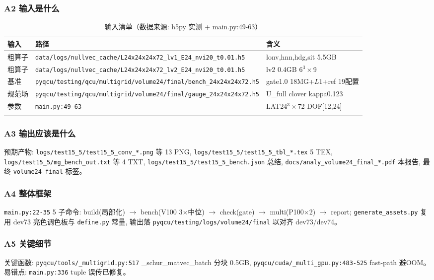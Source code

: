 \documentclass[UTF8]{ctexart}
\begin{document}
\subsubsection{A2 输入是什么}
\begin{xltabular}{\textwidth}{lXl}
\toprule
输入 & 路径 & 含义 \\
\midrule
\endhead
粗算子 & \texttt{\nolinkurl{data/logs/nullvec_cache/L24x24x24x72_lv1_E24_nvi20_t0.01.h5}} & lonv,hnn,hdg,sit 5.5GB \\
粗算子 & \texttt{\nolinkurl{data/logs/nullvec_cache/L24x24x24x72_lv2_E24_nvi20_t0.01.h5}} & lv2 0.4GB 6$^3\times$9 \\
基准 & \texttt{\nolinkurl{pyqcu/testing/qcu/multigrid/volume24/final/bench_24x24x24x72.h5}} & gate1.0 18MG+$L1$+ref 19配置 \\
规范场 & \texttt{\nolinkurl{pyqcu/testing/qcu/multigrid/volume24/final/gauge_24x24x24x72.h5}} & U\_full clover kappa0.123 \\
参数 & \texttt{\nolinkurl{main.py:49-63}} & LAT24$^3\times$72 DOF[12,24] \\
\bottomrule
\caption{输入清单（数据来源: h5py 实测 + main.py:49-63）}
\end{xltabular}

\subsubsection{A3 输出应该是什么}
预期产物: \texttt{\nolinkurl{logs/test15_5/test15_5_conv_*.png}} 等 13 PNG, \texttt{\nolinkurl{logs/test15_5/test15_5_tbl_*.tex}} 5 TEX, \texttt{\nolinkurl{logs/test15_5/mg_bench_out.txt}} 等 4 TXT, \texttt{\nolinkurl{logs/test15_5/test15_5_bench.json}} 总结, \texttt{\nolinkurl{docs/analy_volume24_final_*.pdf}} 本报告, 最终 \texttt{\nolinkurl{volume24_final}} 标签。

\subsubsection{A4 整体框架}
\texttt{\nolinkurl{main.py:22-35}} 5 子命令: build(局部化) $\to$ bench(V100 3$\times$中位) $\to$ check(gate) $\to$ multi(P100$\times$2) $\to$ report; \texttt{\nolinkurl{generate_assets.py}} 复用 dev73 亮色调色板与 \texttt{\nolinkurl{define.py}} 常量, 输出落 \texttt{\nolinkurl{pyqcu/testing/logs/volume24/final}} 以对齐 dev73/dev74。

\subsubsection{A5 关键细节}
关键函数: \texttt{\nolinkurl{pyqcu/tools/_multigrid.py:517}} \_schur\_matvec\_batch 分块 0.5GB, \texttt{\nolinkurl{pyqcu/cuda/_multi_gpu.py:483-525}} fast-path 避OOM。易错点: \texttt{\nolinkurl{main.py:336}} tuple 误传已修复。

\end{document}
